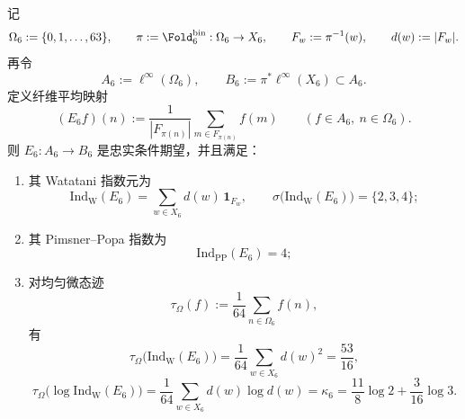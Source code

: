 \begin{theorem}\label{thm:xi-time-part9x-visible-condexp-finite-index-spectrum}
记
\[
\Omega_6:=\{0,1,\dots,63\},
\qquad
\pi:=\Fold_6^{\mathrm{bin}}:\Omega_6\to X_6,
\qquad
F_w:=\pi^{-1}(w),
\qquad
d(w):=|F_w|.
\]
再令
\[
A_6:=\ell^\infty(\Omega_6),
\qquad
B_6:=\pi^\ast \ell^\infty(X_6)\subset A_6.
\]
定义纤维平均映射
\[
(E_6f)(n):=\frac{1}{|F_{\pi(n)}|}\sum_{m\in F_{\pi(n)}}f(m)
\qquad (f\in A_6,\ n\in \Omega_6).
\]
则 \(E_6:A_6\to B_6\) 是忠实条件期望，并且满足：
\begin{enumerate}
  \item 其 Watatani 指数元为
  \[
  \mathrm{Ind}_{\mathrm W}(E_6)
  =
  \sum_{w\in X_6}d(w)\,\mathbf 1_{F_w},
  \qquad
  \sigma\!\bigl(\mathrm{Ind}_{\mathrm W}(E_6)\bigr)=\{2,3,4\};
  \]
  \item 其 Pimsner--Popa 指数为
  \[
  \mathrm{Ind}_{\mathrm{PP}}(E_6)=4;
  \]
  \item 对均匀微态迹
  \[
  \tau_\Omega(f):=\frac{1}{64}\sum_{n\in\Omega_6}f(n),
  \]
  有
  \[
  \tau_\Omega\!\bigl(\mathrm{Ind}_{\mathrm W}(E_6)\bigr)
  =
  \frac{1}{64}\sum_{w\in X_6}d(w)^2
  =
  \frac{53}{16},
  \]
  \[
  \tau_\Omega\!\bigl(\log \mathrm{Ind}_{\mathrm W}(E_6)\bigr)
  =
  \frac{1}{64}\sum_{w\in X_6}d(w)\log d(w)
  =
  \kappa_6
  =
  \frac{11}{8}\log 2+\frac{3}{16}\log 3.
  \]
\end{enumerate}
\end{theorem}
